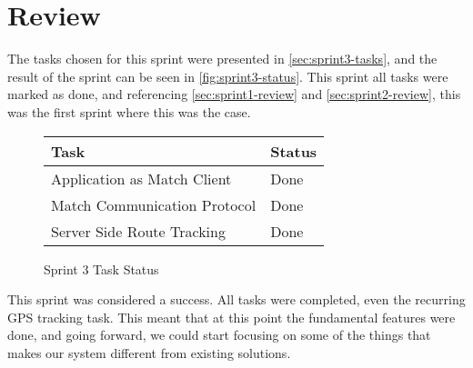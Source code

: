 \section{Review}
\label{sec:sprint3-review}

The tasks chosen for this sprint were presented in \autoref{sec:sprint3-tasks}, and the result of the sprint can be seen in \autoref{fig:sprint3-status}. This sprint all tasks were marked as done, and referencing \autoref{sec:sprint1-review} and \autoref{sec:sprint2-review}, this was the first sprint where this was the case.

\begin{figure}[ht!]
 \caption{Sprint 3 Task Status}
 \label{fig:sprint3-status}
 \begin{tabular}{|l|l|}
  \hline
  \textbf{Task} & \textbf{Status} \\
  \hline
  Application as Match Client & Done \\
  \hline
  Match Communication Protocol & Done \\
  \hline
  Server Side Route Tracking & Done \\
  \hline
 \end{tabular}
\end{figure}

This sprint was considered a success. All tasks were completed, even the recurring \ac{GPS} tracking task. This meant that at this point the fundamental features were done, and going forward, we could start focusing on some of the things that makes our system different from existing solutions.
